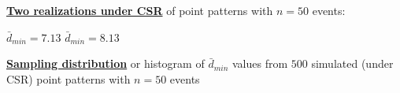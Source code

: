 \documentclass[portrait]{seminar}
\begin{document}
%
%
\begin{slide*}
\begin{center}
 \vspace*{-0.5cm} 
\end{center}
 \vspace{0.3cm}

\underline{\textbf{Two realizations under CSR}} of point patterns
with $n=50$ events:

\vspace{0.1cm}
\begin{center}
\begin{figure}
 \hspace{0.5cm}
\end{figure}
\end{center}
\vspace{-0.4cm} {\small \hspace{1.6cm} $\bar{d}_{min} = 7.13$
\hspace{2.2cm} $\bar{d}_{min} = 8.13$}

\vspace{0.3cm}\underline{\textbf{Sampling distribution}} or
histogram of $\bar{d}_{min}$ values from $500$ simulated (under CSR)
point patterns with $n=50$ events

\vspace{0.0cm}
\begin{center}
\begin{figure}
\end{figure}
\end{center}

\end{slide*}
\end{document}
